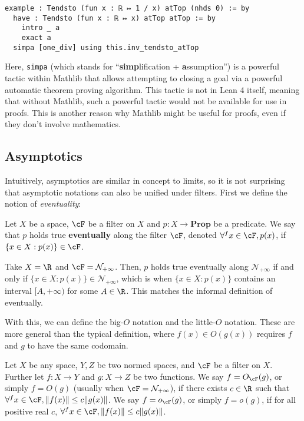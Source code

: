 \begin{verbatim}
example : Tendsto (fun x : ℝ ↦ 1 / x) atTop (nhds 0) := by
  have : Tendsto (fun x : ℝ ↦ x) atTop atTop := by
    intro _ a
    exact a
  simpa [one_div] using this.inv_tendsto_atTop
\end{verbatim}

Here, \texttt{simpa} (which stands for ``\textbf{simp}lification + \textbf{a}ssumption'') is a powerful tactic within Mathlib that allows attempting to closing a goal via a powerful automatic theorem proving algorithm. This tactic is not in Lean 4 itself, meaning that without Mathlib, such a powerful tactic would not be available for use in proofs. This is another reason why Mathlib might be useful for proofs, even if they don't involve mathematics.

\subsection{Asymptotics} \label{def:asympt}

Intuitively, asymptotics are similar in concept to limits, so it is not surprising that asymptotic notations can also be unified under filters. First we define the notion of \textit{eventuality}:

\begin{definition}
  Let \(X\) be a space, \(\cF\) be a filter on \(X\) and \(p : X \to \mathbf{Prop}\) be a predicate. We say that \(p\) holds true \textbf{eventually} along the filter \(\cF\), denoted \(\forall^f x \in \cF, p(x)\), if \(\{x \in X : p(x)\} \in \cF\).
\end{definition}

\begin{example}
  Take \(X = \R\) and \(\cF = \mathcal{N}_{+\infty}\). Then, \(p\) holds true eventually along \(\mathcal{N}_{+\infty}\) if and only if \(\{x \in X : p(x)\} \in \mathcal{N}_{+\infty}\), which is when \(\{x \in X : p(x)\}\) contains an interval \([A, +\infty)\) for some \(A \in \R\). This matches the informal definition of eventually.
\end{example}

With this, we can define the big-\(O\) notation and the little-\(O\) notation. These are more general than the typical definition, where \(f(x) \in O(g(x))\) requires \(f\) and \(g\) to have the same codomain.

\begin{definition}
  Let \(X\) be any space, \(Y, Z\) be two normed spaces, and \(\cF\) be a filter on \(X\). Further let \(f : X \to Y\) and \(g : X \to Z\) be two functions. We say \(f = O_{\cF}(g)\), or simply \(f = O(g)\) (usually when \(\cF = \mathcal{N}_{+\infty}\)), if there exists \(c \in \R\) such that \(\forall^f x \in \cF, \|f(x)\| \leq c\|g(x)\|\). We say \(f = o_{\cF}(g)\), or simply \(f = o(g)\), if for all positive real \(c\), \(\forall^f x \in \cF, \|f(x)\| \leq c\|g(x)\|\).
\end{definition}

